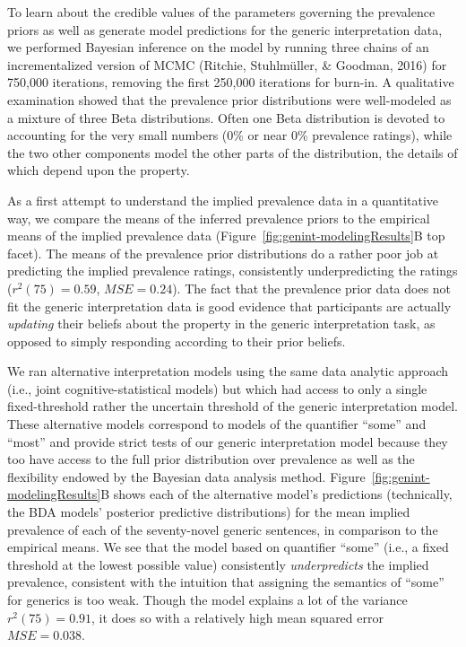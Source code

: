 \documentclass[floatsintext,doc]{apa6}
\theoremstyle{definition}
\theoremstyle{definition}
\theoremstyle{definition}
\theoremstyle{remark}
\begin{document}

To learn about the credible values of the parameters governing the
prevalence priors as well as generate model predictions for the generic
interpretation data, we performed Bayesian inference on the model by
running three chains of an incrementalized version of MCMC (Ritchie,
Stuhlmüller, \& Goodman, 2016) for 750,000 iterations, removing the
first 250,000 iterations for burn-in. A qualitative examination showed
that the prevalence prior distributions were well-modeled as a mixture
of three Beta distributions. Often one Beta distribution is devoted to
accounting for the very small numbers (0\% or near 0\% prevalence
ratings), while the two other components model the other parts of the
distribution, the details of which depend upon the property.

As a first attempt to understand the implied prevalence data in a
quantitative way, we compare the means of the inferred prevalence priors
to the empirical means of the implied prevalence data
(Figure~\ref{fig:genint-modelingResults}B top facet). The means of the
prevalence prior distributions do a rather poor job at predicting the
implied prevalence ratings, consistently underpredicting the ratings
(\(r^2(75) = 0.59\), \(MSE = 0.24\)). The fact that the prevalence prior
data does not fit the generic interpretation data is good evidence that
participants are actually \emph{updating} their beliefs about the
property in the generic interpretation task, as opposed to simply
responding according to their prior beliefs.

We ran alternative interpretation models using the same data analytic
approach (i.e., joint cognitive-statistical models) but which had access
to only a single fixed-threshold rather the uncertain threshold of the
generic interpretation model.
 These alternative models correspond to
models of the quantifier \enquote{some} and \enquote{most} and provide
strict tests of our generic interpretation model because they too have
access to the full prior distribution over prevalence as well as the
flexibility endowed by the Bayesian data analysis method.
Figure~\ref{fig:genint-modelingResults}B shows each of the alternative
model's predictions (technically, the BDA models' posterior predictive
distributions) for the mean implied prevalence of each of the
seventy-novel generic sentences, in comparison to the empirical means.
We see that the model based on quantifier \enquote{some} (i.e., a fixed
threshold at the lowest possible value) consistently
\emph{underpredicts} the implied prevalence, consistent with the
intuition that assigning the semantics of \enquote{some} for generics is
too weak. Though the model explains a lot of the variance
\(r^2(75) = 0.91\), it does so with a relatively high mean squared error
\(MSE = 0.038\).
\end{document}

